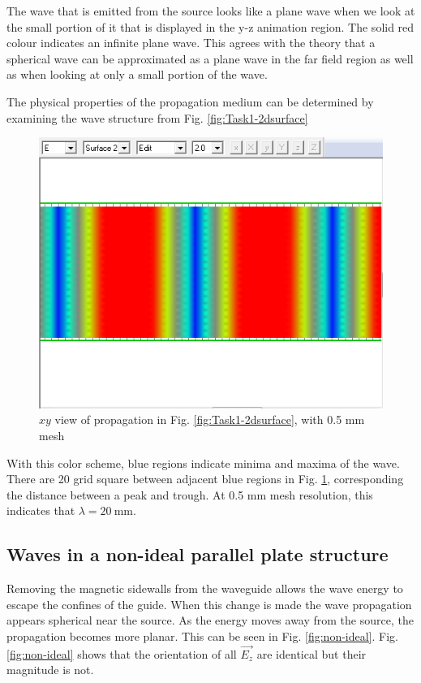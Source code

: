 The wave that is emitted from the source looks like a plane wave when we look at the small portion of it that is displayed in the y-z animation region.
The solid red colour indicates an infinite plane wave.
This agrees with the theory that a spherical wave can be approximated as a plane wave in the far field region as well as when looking at only a small portion of the wave. 

The physical properties of the propagation medium can be determined by examining the wave structure from Fig. \ref{fig:Task1-2dsurface}

\begin{figure}[tbph]
	\centering
	\includegraphics[width=0.7\linewidth]{graphics/Task1-scale}
	\caption{$xy$ view of propagation in Fig. \ref{fig:Task1-2dsurface}, with 0.5 mm mesh}
	\label{fig:Task1-scale}
\end{figure}

With this color scheme, blue regions indicate minima and maxima of the wave.
There are 20 grid square between adjacent blue regions in Fig. \ref{fig:Task1-scale}, corresponding the distance between a peak and trough.
At 0.5 mm mesh resolution, this indicates that $\lambda = \SI{20}{\milli\meter}$.

\newpage
\subsection{Waves in a non-ideal parallel plate structure}\label{sec:non-ideal}
Removing the magnetic sidewalls from the waveguide allows the wave energy to escape the confines of the guide.
When this change is made the wave propagation appears spherical near the source.
As the energy moves away from the source, the propagation becomes more planar.
This can be seen in Fig. \ref{fig:non-ideal}.
Fig. \ref{fig:non-ideal} shows that the orientation of all $\vec{E_z}$ are identical but their magnitude is not.

